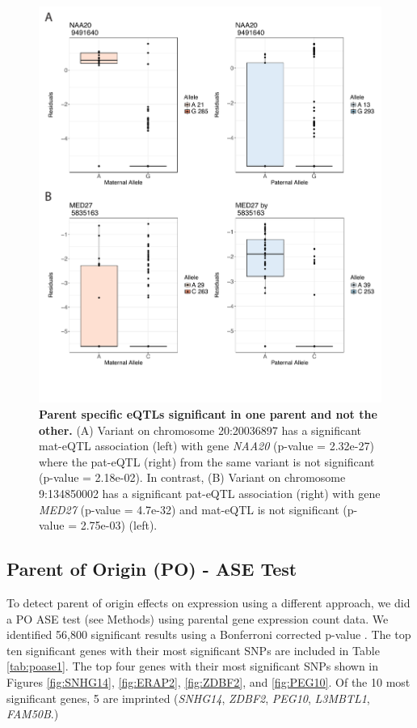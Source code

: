 \begin{figure}[!htb]
\centering \includegraphics[width=5in]{img/ch04/fig-07-sig_notsig.pdf}
\caption[Parent specific eQTLs significant in one parent and not the other.]{\textbf{Parent specific eQTLs significant in one parent and not the other.} (A) Variant on chromosome 20:20036897 has a significant mat-eQTL association (left) with gene \emph{NAA20} (p-value = 2.32e-27) where the pat-eQTL (right) from the same variant is not significant (p-value = 2.18e-02). In contrast, (B) Variant on chromosome 9:134850002 has a significant pat-eQTL association (right) with gene \emph{MED27} (p-value = 4.7e-32) and mat-eQTL is not significant (p-value = 2.75e-03) (left).}
\label{fig:sig_notsig}
\end{figure}


\subsection{Parent of Origin (PO) - ASE Test}\label{Parent of Origin (PO) - ASE Test} 

To detect parent of origin effects on expression using a different approach, we did a PO ASE test (see Methods) using parental gene expression count data. We identified 56,800 significant results using a Bonferroni corrected p-value . The top ten significant genes with their most significant SNPs are included in Table \ref{tab:poase1}. The top four genes with their most significant SNPs shown in Figures \ref{fig:SNHG14}, \ref{fig:ERAP2}, \ref{fig:ZDBF2}, and \ref{fig:PEG10}. Of the 10 most significant genes, 5 are imprinted (\emph{SNHG14}, \emph{ZDBF2}, \emph{PEG10}, \emph{L3MBTL1}, \emph{FAM50B}.)

